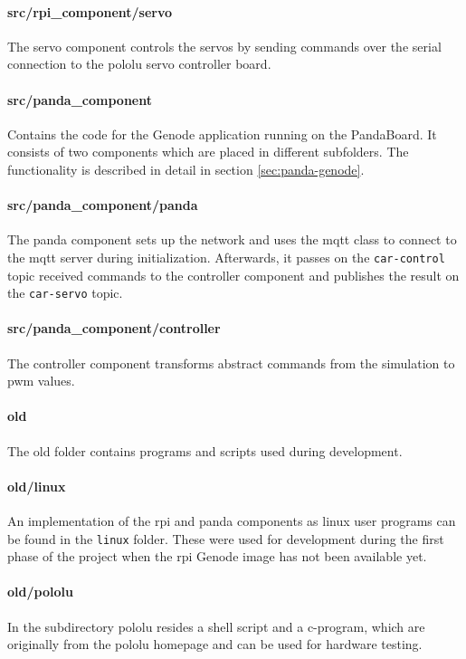 \paragraph{src/rpi\_component/servo}
The servo component controls the servos by sending commands over the serial connection to the pololu servo controller board.

\paragraph{src/panda\_component}
Contains the code for the Genode application running on the PandaBoard. It consists of two components which are placed in different subfolders. The functionality is described in detail in section \ref{sec:panda-genode}.

\paragraph{src/panda\_component/panda}
The panda component sets up the network and uses the mqtt class to connect to the mqtt server during initialization. Afterwards, it passes on the \texttt{car-control} topic received commands to the controller component and publishes the result on the \texttt{car-servo} topic.

\paragraph{src/panda\_component/controller}
The controller component transforms abstract commands from the simulation to pwm values.

\paragraph{old}
The old folder contains programs and scripts used during development.

\paragraph{old/linux}
An implementation of the rpi and panda components as linux user programs can be found in the \texttt{linux} folder.
These were used for development during the first phase of the project when the rpi Genode image has not been available yet.

\paragraph{old/pololu}
In the subdirectory pololu resides a shell script and a c-program, which are originally from the pololu homepage and can be used for hardware testing.

